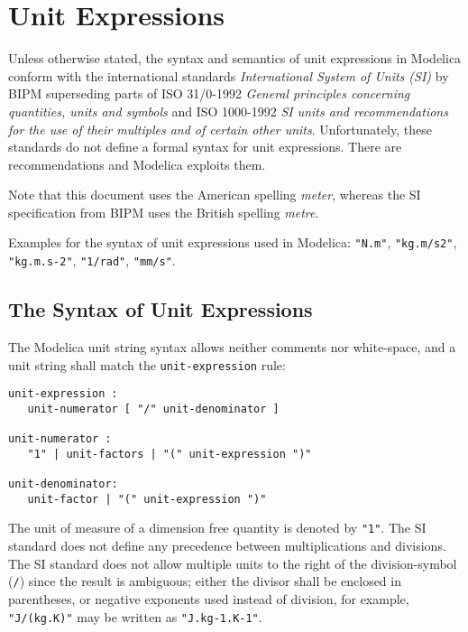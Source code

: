 \chapter{Unit Expressions}\label{unit-expressions}

Unless otherwise stated, the syntax and semantics of unit expressions in Modelica conform with the international standards \emph{International System of Units (SI)} by BIPM superseding parts of ISO 31/0-1992 \emph{General principles concerning quantities, units and symbols} and ISO 1000-1992 \emph{SI units and recommendations for the use of their multiples and of certain other units}.
Unfortunately, these standards do not define a formal syntax for unit expressions.
There are recommendations and Modelica exploits them.

Note that this document uses the American spelling \emph{meter}, whereas the SI specification from BIPM uses the British spelling \emph{metre}.

Examples for the syntax of unit expressions used in Modelica: \lstinline!"N.m"!, \lstinline!"kg.m/s2"!, \lstinline!"kg.m.s-2"!, \lstinline!"1/rad"!, \lstinline!"mm/s"!.

\section{The Syntax of Unit Expressions}\label{the-syntax-of-unit-expressions}

The Modelica unit string syntax allows neither comments nor white-space, and a unit string shall match the \lstinline[language=grammar]!unit-expression! rule:
\begin{lstlisting}[language=grammar]
unit-expression :
   unit-numerator [ "/" unit-denominator ]

unit-numerator :
   "1" | unit-factors | "(" unit-expression ")"

unit-denominator:
   unit-factor | "(" unit-expression ")"
\end{lstlisting}

The unit of measure of a dimension free quantity is denoted by \lstinline!"1"!.
The SI standard does not define any precedence between multiplications and divisions.
The SI standard does not allow multiple units to the right of the division-symbol (\lstinline!/!) since the result is ambiguous; either the divisor shall be enclosed in parentheses, or negative exponents used instead of division, for example, \lstinline!"J/(kg.K)"! may be written as \lstinline!"J.kg-1.K-1"!.

